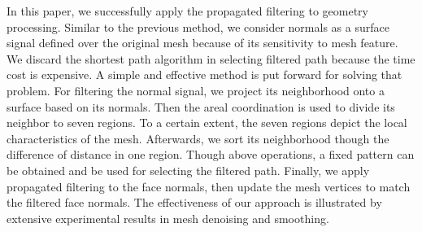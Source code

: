 In this paper, we successfully apply the propagated filtering to geometry processing.
Similar to the previous method, we consider normals as a surface signal defined over the original mesh because of its sensitivity to mesh feature.
We discard the shortest path algorithm in selecting filtered path because the time cost is expensive.
A simple and effective method is put forward for solving that problem.
For filtering the normal signal, we project its neighborhood onto a surface based on its normals.
Then the areal coordination is used to divide its neighbor to seven regions. To a certain extent, the seven regions depict the local characteristics of the mesh.
Afterwards, we sort its neighborhood though the difference of distance in one region.
Though above operations, a fixed pattern can be obtained and be used for selecting the filtered path.
Finally, we apply propagated filtering to the face normals, then update the mesh vertices to match the filtered face normals.
The effectiveness of our approach is illustrated by extensive experimental results in mesh denoising and smoothing.
